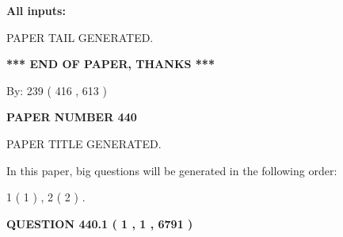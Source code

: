 \documentclass[12pt]{article}
\begin{document}
   
   
   
\noindent{}
   
   
   
   
\noindent\vspace{0.1in}\hspace{-0.08in} {\textbf{\Large{All inputs: }}}
   
   
   
   
   
   
 \vspace{0.2in}
 
   
   
\vspace{2.0in} PAPER TAIL GENERATED.
   
   
   
   
\vspace{1.0in} 
{\textbf{\large{ *** END OF PAPER, THANKS *** }}} 
   
   
\hspace{1.0in} By: 
 239 ( 416 ,  613 )
   
   
   
   
\newpage 
\setcounter{page}{ 
   440001 } 
   
   
   
   
 {\textbf{ \Large{ PAPER NUMBER  440  }}}
   
   
\vspace{0.2in}
   
   
   
   
   
   
   
   
 \vspace{0.2in}
 
 
 
 
   
   
 PAPER TITLE GENERATED.
   
   
   
\vspace{0.2in}
   
In this paper, big questions will be generated in the following order: 
   
   
   1 ( 1 )
 ,
   2 ( 2 )
 .
  
\vspace{0.2in}
  
{\textbf{\Large{QUESTION
440.1 
 ( 1 , 1 , 6791 )
}}}
  
\end{document}
